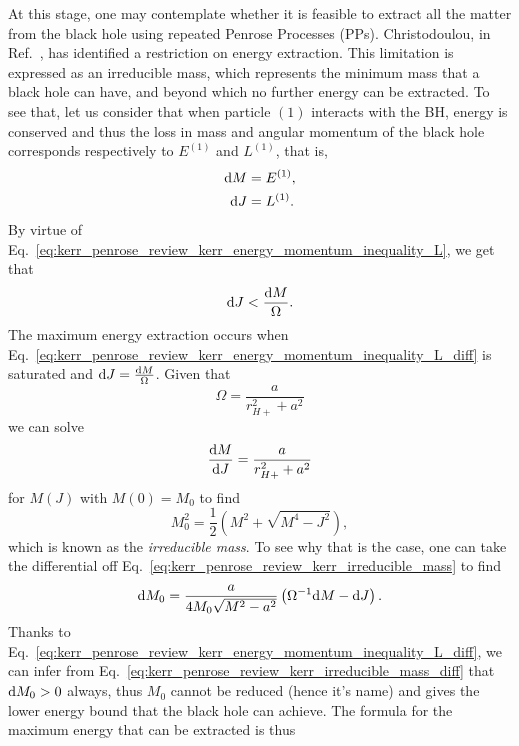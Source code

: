 At this stage, one may contemplate whether it is feasible to extract all the matter from the black hole using repeated Penrose Processes (PPs). Christodoulou, in Ref.~\cite{CHRISTODOULOU1970}, has identified a restriction on energy extraction. This limitation is expressed as an irreducible mass, which represents the minimum mass that a black hole can have, and beyond which no further energy can be extracted. To see that, let us consider that when particle $(1)$ interacts with the BH, energy is conserved and thus the loss in mass and angular momentum of the black hole corresponds respectively to $E^{(1)}$ and $L^{(1)}$, that is,
%
\begin{align}
  \mathrm{d} M & = E^{(1)} \label{eq:kerr_penrose_review_kerr_mass_change}, \\
  \mathrm{d} J & = L^{(1)} \label{eq:kerr_penrose_review_kerr_L_change}.
\end{align}
%
By virtue of Eq.~\eqref{eq:kerr_penrose_review_kerr_energy_momentum_inequality_L}, we get that
%
\begin{equation}
  \mathrm{d} J < \frac{\mathrm{d} M}{\Omega}.
  \label{eq:kerr_penrose_review_kerr_energy_momentum_inequality_L_diff}
\end{equation}
%
The maximum energy extraction occurs when Eq.~\eqref{eq:kerr_penrose_review_kerr_energy_momentum_inequality_L_diff} is saturated and $\mathrm{d} J = \frac{\mathrm{d} M}{\Omega}$. Given that
%
\begin{equation}
  \Omega = \frac{a}{r_{H+}^2 + a^2}
  \label{eq:kerr_penrose_review_kerr_angular_momentum_def}
\end{equation}
%
we can solve
%
\begin{equation}
  \frac{\mathrm{d} M}{\mathrm{d} J} = \frac{a}{r_{H+}^2 + a^2}
  \label{eq:kerr_penrose_review_kerr_mass_ODE}
\end{equation}
%
for $M(J)$ with $M(0) = M_0$ to find
%
\begin{equation}
  M_0^2 = \frac{1}{2}\left( M^2 + \sqrt{M^4 - J^2} \right),
  \label{eq:kerr_penrose_review_kerr_irreducible_mass}
\end{equation}
%
which is known as the \emph{irreducible mass}. To see why that is the case, one can take the differential off Eq.~\eqref{eq:kerr_penrose_review_kerr_irreducible_mass} to find
%
\begin{equation}
  \mathrm{d} M_0 = \frac{a}{4 M_0 \sqrt{M^2 - a^2}}\left( \Omega^{-1} \mathrm{d} M - \mathrm{d} J \right).
  \label{eq:kerr_penrose_review_kerr_irreducible_mass_diff}
\end{equation}
%
Thanks to Eq.~\eqref{eq:kerr_penrose_review_kerr_energy_momentum_inequality_L_diff}, we can infer from Eq.~\eqref{eq:kerr_penrose_review_kerr_irreducible_mass_diff} that $\mathrm{d} M_0 > 0$ always, thus $M_0$ cannot be reduced (hence it's name) and gives the lower energy bound that the black hole can achieve. The formula for the maximum energy that can be extracted is thus
